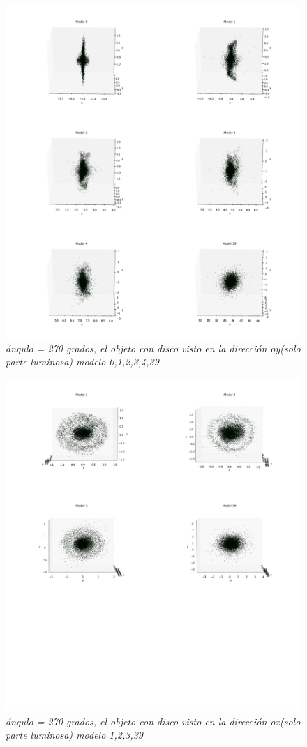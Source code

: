 \documentclass[12pt]{article} %
\renewcommand{\=}[1]{\stackrel{#1}{=}} %
\theoremstyle{definition}
\theoremstyle{remark}
\begin{document}
\begin{figure}[!ht]
 \centering
 \includegraphics[scale=0.2]{270deg-m-c2y.png}
 \caption{\emph{ ángulo = 270 grados, el objeto con disco visto en la dirección oy(solo parte luminosa) modelo 0,1,2,3,4,39 }}
\end{figure}

\begin{figure}[!ht]
 \centering
 \includegraphics[scale=0.2]{270deg-m-c2.png}
 \caption{\emph{ ángulo = 270 grados, el objeto con disco visto en la dirección ox(solo parte luminosa) modelo 1,2,3,39 }}
\end{figure}
\end{document}
